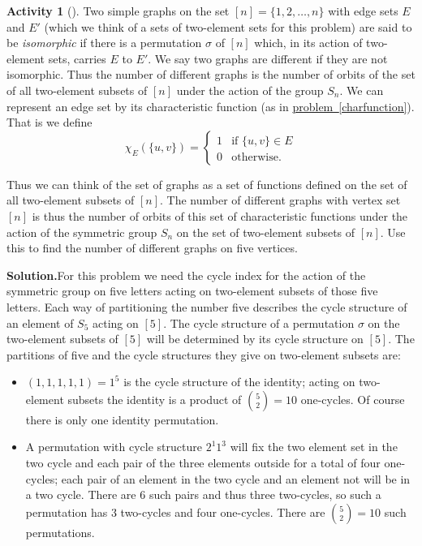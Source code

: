 \documentclass[10pt,]{book}
\theoremstyle{plain}
\theoremstyle{definition}
\newtheorem{activity}[project]{Activity}
\numberwithin{equation}{chapter}
\newcommand{\amp}{&}
\begin{document}
\begin{activity}[]\label{activity-319}
Two simple graphs on the set \([n]= \{1,2,\ldots, n\}\) with edge sets \(E\) and \(E'\) (which we think of a sets of two-element sets for this problem) are said to be \emph{isomorphic} if there is a permutation \(\sigma\) of \([n]\) which, in its action of two-element sets, carries \(E\) to \(E'\). We say two graphs are different if they are not isomorphic. Thus the number of different graphs is the number of orbits of the set of all two-element subsets of \([n]\) under the action of the group \(S_n\). We can represent an edge set by its characteristic function (as in \hyperref[charfunction]{problem~\ref{charfunction}}). That is we define%
\begin{equation*}
\chi_E(\{u,v\}) = \left\{
\begin{array}{ll}
1 \amp  \mbox{if \(\{u,v\}\in E\)} \\
0 \amp  \mbox{otherwise.}
\end{array} \right.
\end{equation*}
%
\par
Thus we can think of the set of graphs as a set of functions defined on the set of all two-element subsets of \([n]\). The number of different graphs with vertex set \([n]\) is thus the number of orbits of this set of characteristic functions under the action of the symmetric group \(S_n\) on the set of two-element subsets of \([n]\). Use this to find the number of different graphs on five vertices.%
\par\medskip\noindent%
\textbf{Solution.}\quad For this problem we need the cycle index for the action of the symmetric group on five letters acting on two-element subsets of those five letters. Each way of partitioning the number five describes the cycle structure of an element of \(S_5\) acting on \([5]\). The cycle structure of a permutation \(\sigma\) on the two-element subsets of \([5]\) will be determined by its cycle structure on \([5]\). The partitions of five and the cycle structures they give on two-element subsets are:%
\leavevmode%
\begin{itemize}[label=\textbullet]
\item{}\((1,1,1,1,1) =1^5\) is the cycle structure of the identity; acting on two-element subsets the identity is a product of \(\binom{5}{2}=10\) one-cycles.  Of course there is only one identity permutation.%
\item{}A permutation with cycle structure \(2^1 1^3\) will fix the two element set in the two cycle and each pair of the three elements outside for a total of four one-cycles; each pair of an element in the two cycle and an element not will be in a two cycle.  There are 6 such pairs and thus three two-cycles, so such a permutation has 3 two-cycles and four one-cycles.  There are \(\binom{5}{2}=10\) such permutations.%

\end{itemize}
\end{activity}
\end{document}
